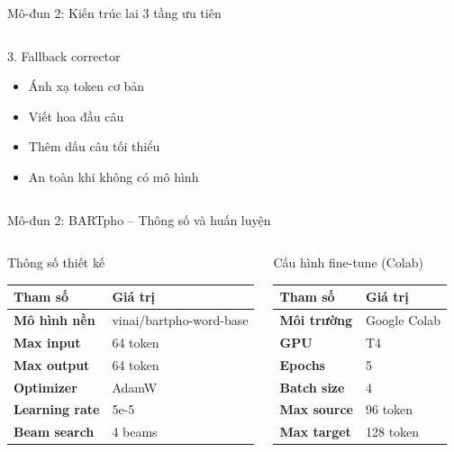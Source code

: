 ﻿\documentclass[aspectratio=169, 11pt]{beamer}
\begin{document}
\begin{frame}{Mô-đun 2: Kiến trúc lai 3 tầng ưu tiên}
\begin{columns}[T]
        \begin{block}{\small 3. Fallback corrector}
            \begin{itemize}\scriptsize
                \item Ánh xạ token cơ bản
                \item Viết hoa đầu câu
                \item Thêm dấu câu tối thiểu
                \item An toàn khi không có mô hình
            \end{itemize}
        \end{block}
    \end{columns}
\end{frame}

\begin{frame}{Mô-đun 2: BARTpho -- Thông số và huấn luyện}
    \begin{columns}[T]
        \begin{block}{Thông số thiết kế}
            \begin{tabular}{>{\small\bfseries}l >{\small}l}
                \toprule
                Tham số & Giá trị \\
                \midrule
                Mô hình nền & vinai/bartpho-word-base \\
                Max input & 64 token \\
                Max output & 64 token \\
                Optimizer & AdamW \\
                Learning rate & 5e-5 \\
                Beam search & 4 beams \\
                \bottomrule
            \end{tabular}
        \end{block}

        \begin{block}{Cấu hình fine-tune (Colab)}
            \begin{tabular}{>{\small\bfseries}l >{\small}l}
                \toprule
                Tham số & Giá trị \\
                \midrule
                Môi trường & Google Colab \\
                GPU & T4 \\
                Epochs & 5 \\
                Batch size & 4 \\
                Max source & 96 token \\
                Max target & 128 token \\
                \bottomrule
            \end{tabular}
        \end{block}
    \end{columns}


\end{frame}
\end{document}
